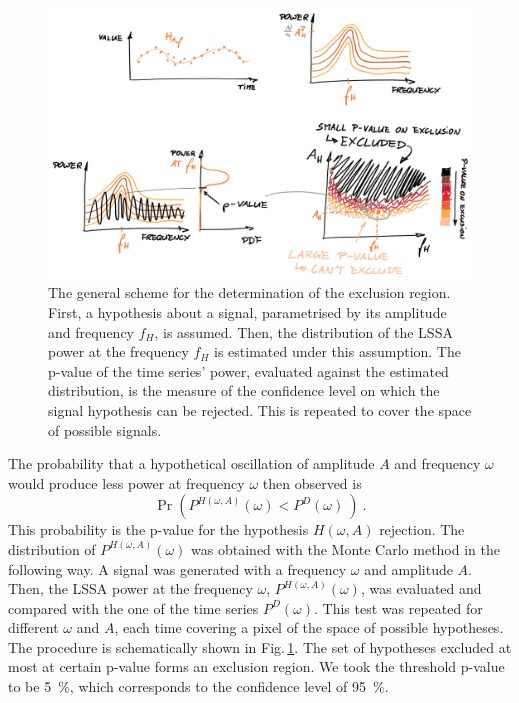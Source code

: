\begin{figure}
  \centering \includegraphics[width=\linewidth]{gfx/axions/exclusion_region.png}
  \caption{The general scheme for the determination of the exclusion region. First, a hypothesis about a signal, parametrised by its amplitude and frequency $f_H$, is assumed. Then, the distribution of the LSSA power at the frequency $f_H$ is estimated under this assumption. The p-value of the time series' power, evaluated against the estimated distribution, is the measure of the confidence level on which the signal hypothesis can be rejected. This is repeated to cover the space of possible signals.}\label{fig:exclusion_region}
\end{figure}

The probability that a hypothetical oscillation of amplitude $A$ and frequency $\omega$ would produce less power at frequency $\omega$ then observed is
\begin{equation}
  \Pr\left( P^{H(\omega, A)}(\omega) < P^D(\omega)\ \right) \ .
\end{equation}
This probability is the p-value for the hypothesis $H(\omega, A)$ rejection. The distribution of $P^{H(\omega, A)}(\omega)$ was obtained with the Monte Carlo method in the following way.
A signal was generated with a frequency $\omega$ and amplitude $A$. Then, the LSSA power at the frequency $\omega$, $P^{H(\omega, A)}(\omega)$, was evaluated and compared with the one of the time series $P^D(\omega)$.
This test was repeated for different $\omega$ and $A$, each time covering a pixel of the space of possible hypotheses. The procedure is schematically shown in Fig.\,\ref{fig:exclusion_region}.
The set of hypotheses excluded at most at certain p-value forms an exclusion region. We took the threshold p-value to be \SI{5}{\percent}, which corresponds to the confidence level of \SI{95}{\percent}.


